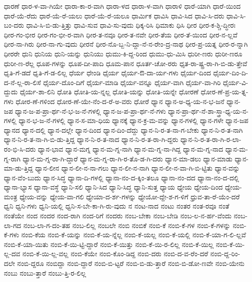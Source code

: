 {ಧಾರಣೆ
ಧಾರ-ಳ-ವಾ-ಗಿಯೇ
ಧಾರಾ-ಕಾ-ರ-ವಾಗಿ
ಧಾರಾ-ಳದ
ಧಾರಾ-ಳ-ವಾಗಿ
ಧಾರಾಳಿ
ಧಾರೆ-ಯಾಗಿ
ಧಾರೆ-ಯಿಂದ
ಧಾರೆ-ಯೆ-ರೆದು
ಧಾರೆ-ಯೆ-ರೆ-ಯಲು
ಧಾರೆ-ಯೆ-ರೆ-ಯಲೂ
ಧಾರ್ಮಿಕ
ಧಾವಿಸಿ
ಧಾವಿ-ಸಿದ
ಧಾವಿ-ಸಿ-ದರು
ಧಾವಿ-ಸಿ-ಬಂ-ದರು
ಧಾವಿ-ಸಿ-ಬಿ-ಡು-ತ್ತಿತ್ತು
ಧಾವಿ-ಸುವ
ಧಾವಿ-ಸು-ವುದು
ಧಿಕ್ಕ-ರಿಸಿ
ಧಿಮಾಕು
ಧಿಸಿ
ಧೀರ
ಧೀರ-ಕ-ಶ್ಚಿ-ದ್ಧೀರಃ
ಧೀರ-ಗಂ-ಭೀರ
ಧೀರ-ಗಂ-ಭೀ-ರ-ವಾಗಿ
ಧೀರ-ತ-ನವೂ
ಧೀರ-ತ-ನವೇ
ಧೀರ-ತೆಯ
ಧೀರ-ತೆ-ಯಿಂದ
ಧೀರ-ನ-ಲ್ಲವೆ
ಧೀರ-ನಾ-ಗಿರು
ಧೀರ-ನಾ-ಗು-ವುದು
ಧೀರನೆ
ಧೀರ-ನೊ-ಬ್ಬ-ನಿ-ದ್ದಾ-ನೆ-ನ-ರೇಂ-ದ್ರ-ನಾಥ
ಧೀರ-ಪ್ರ-ಯತ್ನ
ಧೀರ-ರ-ನ್ನಾಗಿ
ಧೀರರೇ
ಧುನಿ
ಧುನಿಯ
ಧುನಿ-ಯನ್ನು
ಧುನಿಯು
ಧುಮು-ಕಿ-ದ್ದ-ರಿಂದ
ಧುಮು-ಧು-ಮಿಸಿ
ಧುರೀ-ಣರು
ಧುರೀ-ಣರೂ
ಧುರೀ-ಣ-ರೆಲ್ಲ
ಧೂಪ-ಗಳನ್ನು
ಧೂಪ-ದೀ-ಪಾದಿ
ಧೂಮ-ಪಾನ
ಧೂರ್ತ-ಚೋ-ರರು
ಧೃತ-ರಾ-ಷ್ಟ್ರ-ರಾ-ಗಿ-ಬಿ-ಡು-ತ್ತೇವೆ
ಧೃತಿ-ಗೆ-ಡದೆ
ಧೃತಿ-ಗೆ-ಡ-ಲಿಲ್ಲ
ಧೆರ್ಯ
ಧೇಂಡಿ
ಧೈರ್ಯ
ಧೈರ್ಯ-ಔ-ದಾ-ರ್ಯ-ಗಳು
ಧೈರ್ಯ-ದಿಂದ
ಧೈರ್ಯ-ದಿಂ-ದಿ-ದ-ನೆ-ಲ್ಲ-ರಾ-ಲಿಸೆ
ಧೈರ್ಯ-ದೊಂ-ದಿಗೆ
ಧೈರ್ಯ-ಮಾಡಿ
ಧೈರ್ಯ-ವನ್ನೂ
ಧೈರ್ಯ-ವಾಗಿ
ಧೈರ್ಯ-ವಾ-ಗಿರಿ
ಧೈರ್ಯ-ವಿ-ದ್ದುದು
ಧೈರ್ಯ-ಶಾ-ಲಿನಿ
ಧೋತಿ
ಧೋತಿ-ಯ-ನ್ನಲ್ಲ
ಧೋತಿ-ಯನ್ನು
ಧೋತಿ-ಯನ್ನೇ
ಧೋರಣೆ
ಧೋರ-ಣೆ-ಪ್ರ-ಯ-ತ್ನ-ಗಳು
ಧೋರ-ಣೆ-ಗಳಿಂದ
ಧೋರ-ಣೆ-ಯೇ-ನೆಂ-ದ-ರೆ-ಅ-ವರು
ಧೋರೆ
ಧ್ಯಾನ
ಧ್ಯಾನ-ಅ-ಧ್ಯ-ಯ-ನ-ಭ-ಜನೆ
ಧ್ಯಾನ-ಜಪ
ಧ್ಯಾನ-ಜ-ಪ-ಪ್ರಾ-ರ್ಥ-ನೆ-ಭ-ಜ-ನೆ-ಗಳಲ್ಲಿ
ಧ್ಯಾನ-ಜ-ಪ-ಪ್ರಾ-ರ್ಥ-ನೆ-ಗಳು
ಧ್ಯಾನ-ಪ್ರಾ-ರ್ಥ-ನೆ-ಶಾ-ಸ್ತ್ರಾ-ಧ್ಯ-ಯ-ನ-ಗಳಲ್ಲಿ
ಧ್ಯಾನ-ಭ-ಜ-ನೆ-ಗಳಲ್ಲಿ
ಧ್ಯಾನ-ಸ-ಮಾ-ಧಿಯ
ಧ್ಯಾನಕ್ಕೆ
ಧ್ಯಾನ-ಕ್ರ-ಮ-ವನ್ನು
ಧ್ಯಾನ-ಗಳಲ್ಲಿ
ಧ್ಯಾನ-ಗಳೇ
ಧ್ಯಾನ-ಜಪ
ಧ್ಯಾನದ
ಧ್ಯಾನ-ದಲ್ಲಿ
ಧ್ಯಾನ-ದಲ್ಲೇ
ಧ್ಯಾನ-ದಿಂದ
ಧ್ಯಾನ-ದಿಂ-ದೆದ್ದು
ಧ್ಯಾನ-ನಿ-ರ-ತ-ನಾ-ಗ-ಬೇಕು
ಧ್ಯಾನ-ನಿ-ರ-ತ-ನಾಗಿ
ಧ್ಯಾನ-ನಿ-ರ-ತ-ನಾ-ಗಿ-ಬಿ-ಡು-ತ್ತಿದ್ದ
ಧ್ಯಾನ-ನಿ-ರ-ತ-ನಾದ
ಧ್ಯಾನ-ನಿ-ರ-ತ-ರಾ-ಗಿ-ದ್ದರು
ಧ್ಯಾನ-ನಿ-ರ-ತ-ರಾ-ಗಿ-ರ-ಲಾ-ರಂ-ಭಿ-ಸಿ-ದರು
ಧ್ಯಾನ-ಭಾವ
ಧ್ಯಾನ-ಮಗ್ನ
ಧ್ಯಾನ-ಮ-ಗ್ನ-ನಾಗಿ
ಧ್ಯಾನ-ಮ-ಗ್ನ-ನಾ-ಗಿದ್ದ
ಧ್ಯಾನ-ಮ-ಗ್ನ-ನಾದ
ಧ್ಯಾನ-ಮ-ಗ್ನ-ರಾಗಿ
ಧ್ಯಾನ-ಮ-ಗ್ನ-ರಾ-ಗಿ-ದ್ದಾರೆ
ಧ್ಯಾನ-ಮ-ಗ್ನ-ರಾ-ಗಿ-ರ-ತೊ-ಡ-ಗಿ-ದರು
ಧ್ಯಾನ-ಮಾ-ಡಲು
ಧ್ಯಾನ-ಮಾಡು
ಧ್ಯಾನ-ಮಾ-ಡು-ತ್ತಿದ್ದ
ಧ್ಯಾನ-ಲೀನ
ಧ್ಯಾನ-ಲೀ-ನ-ನಾ-ಗಲು
ಧ್ಯಾನ-ಲೀ-ನ-ನಾಗಿ
ಧ್ಯಾನ-ಲೀ-ನ-ವಾ-ಗಿ-ಬಿ-ಟ್ಟಿತು
ಧ್ಯಾನ-ವನ್ನು
ಧ್ಯಾನ-ವೆಂ-ಬುದು
ಧ್ಯಾನ-ಸಿದ್ಧ
ಧ್ಯಾನಾ-ದಿ-ಗಳಲ್ಲಿ
ಧ್ಯಾನಾ-ನಂ-ದ-ಕ್ಕಿಂ-ತಲೂ
ಧ್ಯಾನಾ-ನಂ-ದದ
ಧ್ಯಾನಾ-ನಂ-ದ-ದಲ್ಲಿ
ಧ್ಯಾನಾ-ಭ್ಯಾಸ
ಧ್ಯಾನಾ-ವಸ್ಥೆ
ಧ್ಯಾನಿ-ಸಲಿ
ಧ್ಯಾನಿ-ಸಿದ
ಧ್ಯಾನಿ-ಸಿದ್ಧ
ಧ್ಯಾನಿ-ಸುತ್ತ
ಧ್ಯಾಯ
ಧ್ಯೇಯ
ಧ್ಯೇಯ-ದಿಂದ
ಧ್ಯೇಯ-ಮಂತ್ರ
ಧ್ಯೇಯ-ವನ್ನು
ಧ್ಯೇಯ-ವಾ-ಗಲಿ
ಧ್ಯೇಯಾ-ದ-ರ್ಶ-ಗಳನ್ನು
ಧ್ಯೇಯೋ-ದ್ದೇ-ಶ-ಗ-ಳಿಗೆ
ಧ್ರುವ-ತಾ-ರೆ-ಯೆಂ-ದರೆ
ಧ್ವನಿ
ಧ್ವನಿ-ಗಳು
ಧ್ವನಿ-ಯಲ್ಲಿ
ಧ್ವನಿ-ಸ-ಬೇ-ಕಾ-ಗಿ-ರು-ವುದು
ನ
ನಂಟ-ನಾದ
ನಂಟು
ನಂತರ
ನಂತ-ರವೂ
ನಂತೆ
ನಂತೆಯೇ
ನಂದ
ನಂದರ
ನಂದ-ರಾಗಿ
ನಂದ-ರಿಗೆ
ನಂದರು
ನಂಬ-ಬೇಕಾ
ನಂಬ-ಬೇಡಿ
ನಂಬ-ಲ-ನ-ರ್ಹ-ವೆಂದು
ನಂಬ-ಲಾ-ಗದ
ನಂಬ-ಲಾ-ಗ-ದಂ-ತಹ
ನಂಬ-ಲಿಲ್ಲ
ನಂಬಲೇ
ನಂಬಿ
ನಂಬಿಕೆ
ನಂಬಿ-ಕೆ
ನಂಬಿ-ಕೆ-ಗಳ
ನಂಬಿ-ಕೆ-ಗಳನ್ನು
ನಂಬಿ-ಕೆ-ಗಳು
ನಂಬಿ-ಕೆಯ
ನಂಬಿ-ಕೆ-ಯನ್ನು
ನಂಬಿ-ಕೆ-ಯ-ನ್ನೆಲ್ಲ
ನಂಬಿ-ಕೆ-ಯಲ್ಲ
ನಂಬಿ-ಕೆ-ಯಲ್ಲಿ
ನಂಬಿ-ಕೆ-ಯಾ-ಗ-ಲಿ-ಲ್ಲವೆ
ನಂಬಿ-ಕೆ-ಯಾ-ಯಿತು
ನಂಬಿ-ಕೆ-ಯಿ-ಟ್ಟಿ-ದ್ದಾರೆ
ನಂಬಿ-ಕೆ-ಯಿತ್ತು
ನಂಬಿ-ಕೆ-ಯಿ-ರ-ಲಿಲ್ಲ
ನಂಬಿ-ಕೆ-ಯಿಲ್ಲ
ನಂಬಿ-ಕೆ-ಯಿ-ಲ್ಲ-ದವ
ನಂಬಿ-ಕೆ-ಯಿ-ಲ್ಲ-ವಲ್ಲ
ನಂಬಿ-ಕೆಯೇ
ನಂಬಿ-ಕೊಂ-ಡಿದ್ದ
ನಂಬಿ-ದರು
ನಂಬಿ-ದ-ವ-ರೆಂ-ದರೆ
ನಂಬಿ-ದ್ದ-ರಿಂ-ದಲೇ
ನಂಬಿ-ದ್ದರೂ
ನಂಬಿದ್ದಾ
ನಂಬಿ-ದ್ದಾರೆ
ನಂಬಿ-ಬಿ-ಟ್ಟರೆ
ನಂಬಿ-ಬಿ-ಡು-ತ್ತಾರೆ
ನಂಬಿ-ಬಿ-ಡೋ-ಣವೇ
ನಂಬಿ-ಯೇನು
ನಂಬು
ನಂಬು-ತ್ತಾರೆ
ನಂಬು-ತ್ತಿ-ರ-ಲಿಲ್ಲ
}
